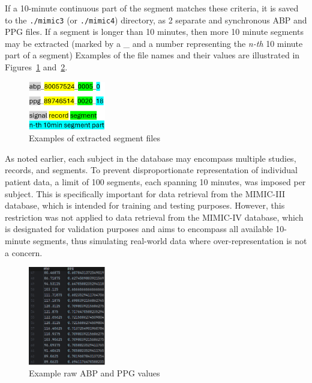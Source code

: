 If a 10-minute continuous part of the segment matches these criteria, it is saved to the \texttt{./mimic3} (or \texttt{./mimic4}) directory, as 2 separate and synchronous ABP and PPG files.
If a segment is longer than 10 minutes, then more 10 minute segments may be extracted (marked by a \_ and a number representing the \textit{n-th} 10 minute part of a segment)
Examples of the file names and their values are illustrated in Figures~\ref{fig:segments} and~\ref{fig:values}.

\begin{figure}
    \vspace*{-10mm}
    \begin{center}
        \includegraphics[width=0.3\textwidth]{images/methods/segments}
    \end{center}
    \vspace*{-7mm}
    \captionsetup{format=plain, justification=centering}
    \caption{\small Examples of extracted segment files}
    \label{fig:segments}
\end{figure}

As noted earlier, each subject in the database may encompass multiple studies, records, and segments.
To prevent disproportionate representation of individual patient data, a limit of 100 segments, each spanning 10 minutes, was imposed per subject.
This is specifically important for data retrieval from the MIMIC-III database, which is intended for training and testing purposes.
However, this restriction was not applied to data retrieval from the MIMIC-IV database, which is designated for validation purposes and aims to encompass all available 10-minute segments, thus simulating real-world data where over-representation is not a concern.

\begin{figure}
    \vspace*{-5mm}
    \begin{center}
        \includegraphics[width=0.3\textwidth]{images/methods/values}
    \end{center}
    \vspace*{-7mm}
    \captionsetup{format=plain, justification=centering}
    \caption{\small Example raw ABP and PPG values}
    \label{fig:values}
\end{figure}

